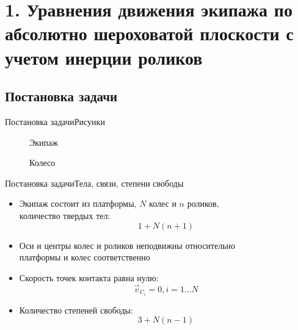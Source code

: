 \section{1. Уравнения движения экипажа по абсолютно шероховатой плоскости с учетом инерции роликов}

\subsection{Постановка задачи}

\begin{frame}{Постановка задачи}{Рисунки}
    \begin{figure}
        \centering
            \caption{Экипаж}
        \endminipage
            \caption{Колесо}
        \endminipage
    \end{figure}
\end{frame}

\begin{frame}{Постановка задачи}{Тела, связи, степени свободы}
  \begin{itemize}
  \item {
    Экипаж состоит из платформы, $N$ колес и $n$ роликов,\\
    количество твердых тел:
    $$1 + N(n+1)$$
  }
  \item{
    Оси и центры колес и роликов неподвижны относительно\\
    платформы и колес соответственно
  }
  \item {
    Скорость точек контакта равна нулю:
    $$\vec{v}_{C_i} = 0, i = 1\dots N$$
  }
  \item{
    Количество степеней свободы:
    $$3 + N(n-1)$$
  }

  \end{itemize}
\end{frame}

